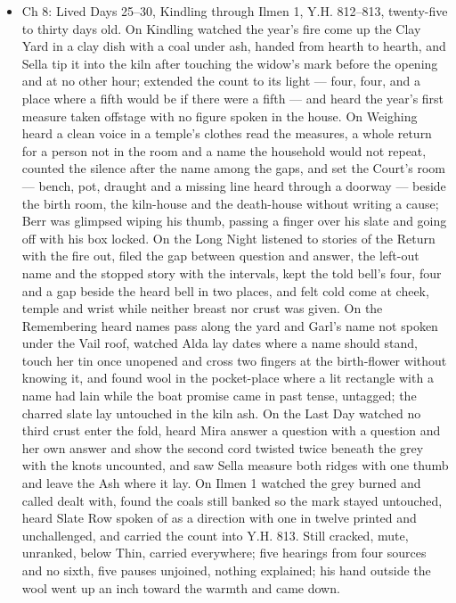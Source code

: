 \documentclass{design/chronicle}
\begin{document}
{\begin{itemize}[leftmargin=1.4em,itemsep=1pt,topsep=3pt,parsep=0pt]
\end{itemize}

\begin{itemize}[leftmargin=1.4em,itemsep=1pt,topsep=3pt,parsep=0pt]

\item Ch 8: Lived Days 25--30, Kindling through Ilmen 1, Y.H. 812--813, twenty-five to thirty days old. On Kindling watched the year’s fire come up the Clay Yard in a clay dish with a coal under ash, handed from hearth to hearth, and Sella tip it into the kiln after touching the widow’s mark before the opening and at no other hour; extended the count to its light --- four, four, and a place where a fifth would be if there were a fifth --- and heard the year’s first measure taken offstage with no figure spoken in the house. On Weighing heard a clean voice in a temple’s clothes read the measures, a whole return for a person not in the room and a name the household would not repeat, counted the silence after the name among the gaps, and set the Court’s room --- bench, pot, draught and a missing line heard through a doorway --- beside the birth room, the kiln-house and the death-house without writing a cause; Berr was glimpsed wiping his thumb, passing a finger over his slate and going off with his box locked. On the Long Night listened to stories of the Return with the fire out, filed the gap between question and answer, the left-out name and the stopped story with the intervals, kept the told bell’s four, four and a gap beside the heard bell in two places, and felt cold come at cheek, temple and wrist while neither breast nor crust was given. On the Remembering heard names pass along the yard and Garl’s name not spoken under the Vail roof, watched Alda lay dates where a name should stand, touch her tin once unopened and cross two fingers at the birth-flower without knowing it, and found wool in the pocket-place where a lit rectangle with a name had lain while the boat promise came in past tense, untagged; the charred slate lay untouched in the kiln ash. On the Last Day watched no third crust enter the fold, heard Mira answer a question with a question and her own answer and show the second cord twisted twice beneath the grey with the knots uncounted, and saw Sella measure both ridges with one thumb and leave the Ash where it lay. On Ilmen 1 watched the grey burned and called dealt with, found the coals still banked so the mark stayed untouched, heard Slate Row spoken of as a direction with one in twelve printed and unchallenged, and carried the count into Y.H. 813. Still cracked, mute, unranked, below Thin, carried everywhere; five hearings from four sources and no sixth, five pauses unjoined, nothing explained; his hand outside the wool went up an inch toward the warmth and came down.


\end{itemize}}
\end{document}
